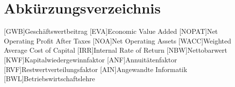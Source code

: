 \chapter{Abkürzungsverzeichnis}

\begin{acronym}
    [GWB]{Geschäftswertbeitrag}
    [EVA]{Economic Value Added}
    [NOPAT]{Net Operating Profit After Taxes}
    [NOA]{Net Operating Assets}
    [WACC]{Weighted Average Cost of Capital}
    [IRR]{Internal Rate of Return}
    [NBW]{Nettobarwert}
    [KWF]{Kapitalwiedergewinnfaktor}
    [ANF]{Annuitätenfaktor}
    [RVF]{Restwertverteilungsfaktor}
    [AIN]{Angewandte Informatik}
    [BWL]{Betriebswirtschaftslehre}
\end{acronym}